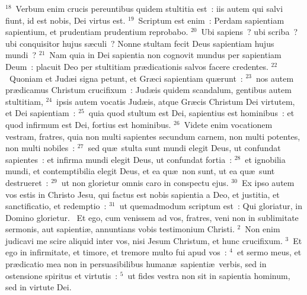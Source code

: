 ${}^{18}$~Verbum enim crucis pereuntibus quidem stultitia est~: iis autem qui salvi fiunt, id est nobis, Dei virtus est.
${}^{19}$~Scriptum est enim~: Perdam sapientiam sapientium, et prudentiam prudentium reprobabo.
${}^{20}$~Ubi sapiens~? ubi scriba~? ubi conquisitor hujus s\ae culi~? Nonne stultam fecit Deus sapientiam hujus mundi~?
${}^{21}$~Nam quia in Dei sapientia non cognovit mundus per sapientiam Deum~: placuit Deo per stultitiam pr\ae dicationis salvos facere credentes.
${}^{22}$~Quoniam et Jud\ae i signa petunt, et Gr\ae ci sapientiam qu\ae runt~:
${}^{23}$~nos autem pr\ae dicamus Christum crucifixum~: Jud\ae is quidem scandalum, gentibus autem stultitiam,
${}^{24}$~ipsis autem vocatis Jud\ae is, atque Gr\ae cis Christum Dei virtutem, et Dei sapientiam~:
${}^{25}$~quia quod stultum est Dei, sapientius est hominibus~: et quod infirmum est Dei, fortius est hominibus.
${}^{26}$~Videte enim vocationem vestram, fratres, quia non multi sapientes secundum carnem, non multi potentes, non multi nobiles~:
${}^{27}$~sed qu\ae\ stulta sunt mundi elegit Deus, ut confundat sapientes~: et infirma mundi elegit Deus, ut confundat fortia~:
${}^{28}$~et ignobilia mundi, et contemptibilia elegit Deus, et ea qu\ae\ non sunt, ut ea qu\ae\ sunt destrueret~:
${}^{29}$~ut non glorietur omnis caro in conspectu ejus.
${}^{30}$~Ex ipso autem vos estis in Christo Jesu, qui factus est nobis sapientia a Deo, et justitia, et sanctificatio, et redemptio~:
${}^{31}$~ut quemadmodum scriptum est~: Qui gloriatur, in Domino glorietur.
~Et ego, cum venissem ad vos, fratres, veni non in sublimitate sermonis, aut sapienti\ae , annuntians vobis testimonium Christi.
${}^{2}$~Non enim judicavi me scire aliquid inter vos, nisi Jesum Christum, et hunc crucifixum.
${}^{3}$~Et ego in infirmitate, et timore, et tremore multo fui apud vos~:
${}^{4}$~et sermo meus, et pr\ae dicatio mea non in persuasibilibus human\ae\ sapienti\ae\ verbis, sed in ostensione spiritus et virtutis~:
${}^{5}$~ut fides vestra non sit in sapientia hominum, sed in virtute Dei.


